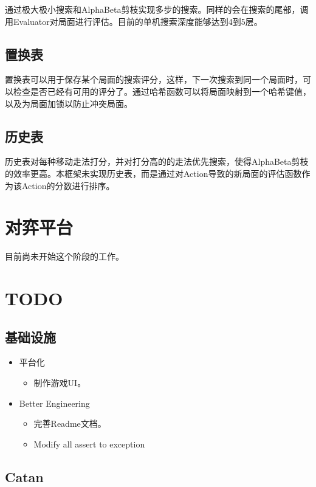 \documentclass[export, 12pt, letterpaper]{ctexrep}
\begin{document}
通过极大极小搜索和AlphaBeta剪枝实现多步的搜索。同样的会在搜索的尾部，调用Evaluator对局面进行评估。目前的单机搜索深度能够达到4到5层。

\section{置换表}

置换表可以用于保存某个局面的搜索评分，这样，下一次搜索到同一个局面时，可以检查是否已经有可用的评分了。通过哈希函数可以将局面映射到一个哈希键值，以及为局面加锁以防止冲突局面。

\section{历史表}

历史表对每种移动走法打分，并对打分高的的走法优先搜索，使得AlphaBeta剪枝的效率更高。本框架未实现历史表，而是通过对Action导致的新局面的评估函数作为该Action的分数进行排序。

\chapter{对弈平台}

目前尚未开始这个阶段的工作。

\chapter{TODO}

\section{基础设施}


\begin{itemize}
\item{ 平台化
\begin{itemize}
\item{ 制作游戏UI。 }
\end{itemize}
 }
\item{ Better Engineering
\begin{itemize}
\item{ 完善Readme文档。 }
\item{ Modify all assert to exception }
\end{itemize}
 }
\end{itemize}


\section{Catan}
\end{document}
